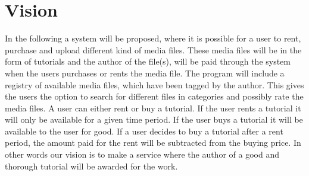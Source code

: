 \section{Vision}
In the following a system will be proposed, where it is possible for a user to rent, purchase and upload different kind of media files. These media files will be in the form of tutorials and the author of the file(s), will be paid through the system when the users purchases or rents the media file. The program will include a registry of available media files, which have been tagged by the author. This gives the users the option to search for different files in categories and possibly rate the media files.
A user can either rent or buy a tutorial. If the user rents a tutorial it will only be available for a given time period. If the user buys a tutorial it will be available to the user for good. If a user decides to buy a tutorial after a rent period, the amount paid for the rent will be subtracted from the buying price. 
In other words our vision is to make a service where the author of a good and thorough tutorial will be awarded for the work.